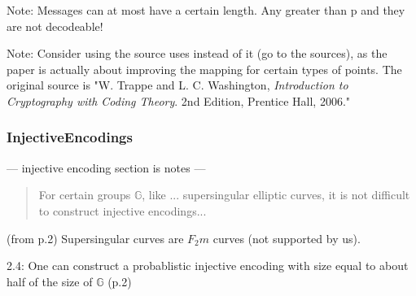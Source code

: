 Note: Messages can at most have a certain length. Any greater than p and they are not decodeable!

Note: Consider using the source \cite{MappingAMessage} uses instead of it (go to the sources), as the paper is actually about improving the mapping
for certain types of points. The original source is "W. Trappe and L. C. Washington, \emph{Introduction to Cryptography with Coding Theory}. 2nd Edition,
Prentice Hall, 2006."

\subsubsection{InjectiveEncodings}

--- injective encoding section is notes ---

\begin{quote}
    For certain groups \(\mathbb{G}\), like ... supersingular elliptic curves, it is not difficult to construct injective
	encodings...
\end{quote}

(from p.2) Supersingular curves are \(F_2m\) curves (not supported by us).

2.4: One can construct a probablistic injective encoding with size equal to about half of the size of \(\mathbb{G}\) (p.2)